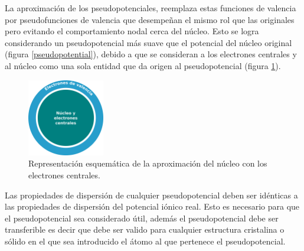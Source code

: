 \noindent La aproximaci\'on de los pseudopotenciales, reemplaza estas funciones 
de 
valencia por pseudofunciones de valencia que desempe\~nan el mismo rol 
que las 
originales pero evitando el comportamiento nodal cerca del n\'ucleo. 
Esto se 
logra considerando un pseudopotencial m\'as suave que el potencial del 
n\'ucleo 
original (figura \ref{pseudopotential}), debido a que se consideran a 
los 
electrones centrales y al n\'ucleo como una sola entidad que da origen 
al 
pseudopotencial (figura \ref{ElectronUnion}).

\begin{figure}[H]
    \centering
    \includegraphics[width=0.3\textwidth]{contenido/calculos_computacionales/pseudopotencial/img_pseudopotencial/ElectronUnion.png}
    \caption[Representaci\'on esquem\'atica de la aproximaci\'on del 
    n\'ucleo 
    con los electrones centrales]{Representaci\'on esquem\'atica de la 
    aproximaci\'on del 
    n\'ucleo 
    con los electrones centrales.}
    \label{ElectronUnion}
\end{figure}

\noindent Las propiedades de dispersi\'on de cualquier pseudopotencial deben 
ser 
id\'enticas a las propiedades de dispersi\'on del potencial i\'onico 
real. Esto 
es necesario para que el pseudopotencial sea considerado \'util, adem\'as el 
pseudopotencial debe ser transferible es decir que debe ser valido para 
cualquier 
estructura cristalina o s\'olido en el que sea introducido el \'atomo al 
que 
pertenece el pseudopotencial.